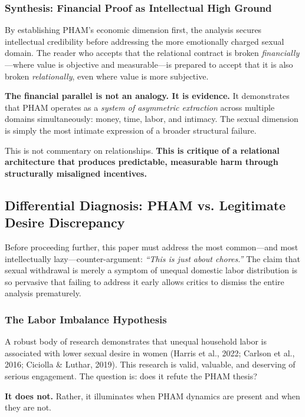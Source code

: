 \documentclass[12pt, letterpaper]{article}
\begin{document}
\subsubsection{Synthesis: Financial Proof as Intellectual High Ground}

By establishing PHAM's economic dimension first, the analysis secures intellectual credibility before addressing the more emotionally charged sexual domain. The reader who accepts that the relational contract is broken \textit{financially}---where value is objective and measurable---is prepared to accept that it is also broken \textit{relationally}, even where value is more subjective.

\textbf{The financial parallel is not an analogy. It is evidence.} It demonstrates that PHAM operates as a \textit{system of asymmetric extraction} across multiple domains simultaneously: money, time, labor, and intimacy. The sexual dimension is simply the most intimate expression of a broader structural failure.

This is not commentary on relationships. \textbf{This is critique of a relational architecture that produces predictable, measurable harm through structurally misaligned incentives.}

\subsection{Differential Diagnosis: PHAM vs. Legitimate Desire Discrepancy}

Before proceeding further, this paper must address the most common---and most intellectually lazy---counter-argument: \textit{``This is just about chores.''} The claim that sexual withdrawal is merely a symptom of unequal domestic labor distribution is so pervasive that failing to address it early allows critics to dismiss the entire analysis prematurely.

\subsubsection{The Labor Imbalance Hypothesis}

A robust body of research demonstrates that unequal household labor is associated with lower sexual desire in women (Harris et al., 2022; Carlson et al., 2016; Ciciolla \& Luthar, 2019). This research is valid, valuable, and deserving of serious engagement. The question is: does it refute the PHAM thesis?

\textbf{It does not.} Rather, it illuminates when PHAM dynamics are present and when they are not.
\end{document}
